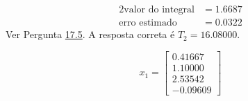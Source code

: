 %
\begin{alignat*}{2}
	\text{valor do integral} &= 1.6687\\
	\text{erro estimado}     &= 0.0322
\end{alignat*}
Ver Pergunta \hyperref[ssec:17_5]{17.5}.
%
A resposta correta é $T_2=16.08000$.

%
\begin{equation*}
	x_1 = \begin{bmatrix}
		0.41667\\
		1.10000\\
		2.53542\\
		-0.09609
	\end{bmatrix}
\end{equation*}
